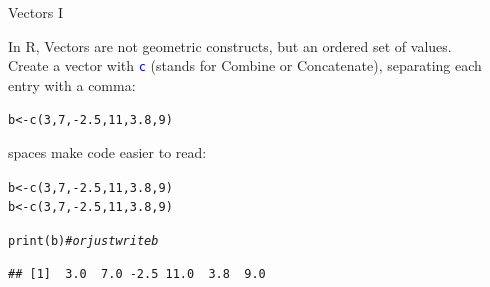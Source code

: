 \documentclass[xcolor=table,       handout,    xcolor=dvipsnames]{beamer}\usepackage[]{graphicx}\usepackage[]{color}
\makeatletter
\newcommand{\hlnum}[1]{\textcolor[rgb]{0,0,0}{#1}}
\newcommand{\hlcom}[1]{\textcolor[rgb]{0,0.392,0}{\textit{#1}}}
\newcommand{\hlopt}[1]{\textcolor[rgb]{0,0,0}{#1}}
\newcommand{\hlstd}[1]{\textcolor[rgb]{0,0,0}{#1}}
\newcommand{\hlkwb}[1]{\textcolor[rgb]{0,0,0}{#1}}
\newcommand{\hlkwd}[1]{\textcolor[rgb]{0,0,1}{#1}}
\newenvironment{kframe}{%
 \def\at@end@of@kframe{}%
 \ifinner\ifhmode%
  \def\at@end@of@kframe{\end{minipage}}%
  \begin{minipage}{\columnwidth}%
 \fi\fi%
 \def\FrameCommand##1{\hskip\@totalleftmargin \hskip-\fboxsep
 \colorbox{shadecolor}{##1}\hskip-\fboxsep
     \hskip-\linewidth \hskip-\@totalleftmargin \hskip\columnwidth}%
 \MakeFramed {\advance\hsize-\width
   \@totalleftmargin\z@ \linewidth\hsize
   \@setminipage}}%
 {\par\unskip\endMakeFramed%
 \at@end@of@kframe}
\newenvironment{knitrout}{}{} %
\newcommand{\rcode}[1]{\texttt{\textcolor{Blue}{#1}}} %
\makeatother
\begin{document}
\begin{frame}[fragile]{Vectors I}

In R, Vectors are not geometric constructs, but an ordered set of values.\\
\onslide<+->
Create a vector with \rcode{c} (stands for Combine or Concatenate), separating each entry with a comma:
\onslide<+->
\begin{knitrout}
\color{fgcolor}\begin{kframe}
\begin{alltt}
\hlstd{b} \hlkwb{<-} \hlkwd{c}\hlstd{(}\hlnum{3}\hlstd{,} \hlnum{7}\hlstd{,} \hlopt{-}\hlnum{2.5}\hlstd{,} \hlnum{11}\hlstd{,} \hlnum{3.8}\hlstd{,} \hlnum{9}\hlstd{)}
\end{alltt}
\end{kframe}
\end{knitrout}
\onslide<+->
spaces make code easier to read:
\begin{knitrout}
\color{fgcolor}\begin{kframe}
\begin{alltt}
\hlstd{b}\hlkwb{<-}\hlkwd{c}\hlstd{(}\hlnum{3}\hlstd{,}\hlnum{7}\hlstd{,}\hlopt{-}\hlnum{2.5}\hlstd{,}\hlnum{11}\hlstd{,}\hlnum{3.8}\hlstd{,}\hlnum{9}\hlstd{)}
\hlstd{b} \hlkwb{<-} \hlkwd{c}\hlstd{(}\hlnum{3}\hlstd{,} \hlnum{7}\hlstd{,} \hlopt{-}\hlnum{2.5}\hlstd{,} \hlnum{11}\hlstd{,} \hlnum{3.8}\hlstd{,} \hlnum{9}\hlstd{)}
\end{alltt}
\end{kframe}
\end{knitrout}
\onslide<+->
\begin{knitrout}
\color{fgcolor}\begin{kframe}
\begin{alltt}
\hlkwd{print}\hlstd{(b)} \hlcom{# or just write   b}
\end{alltt}
\begin{verbatim}
## [1]  3.0  7.0 -2.5 11.0  3.8  9.0
\end{verbatim}
\end{kframe}
\end{knitrout}
\end{frame}

\end{document}
